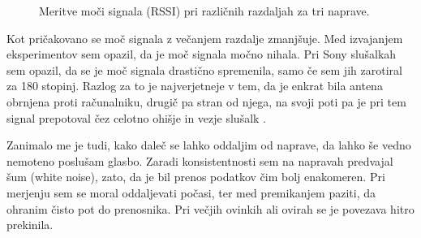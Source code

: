 \documentclass[11pt,a4paper,slovene]{article}
\begin{document}
\begin{figure}[H]
\centering
{}
\caption{Meritve moči signala (RSSI) pri različnih razdaljah za tri naprave.}
\label{fig:rssi-graf}
\end{figure}

Kot pričakovano se moč signala z večanjem razdalje zmanjšuje. Med izvajanjem eksperimentov sem opazil, da je moč signala močno nihala. Pri Sony slušalkah sem opazil, da se je moč signala drastično spremenila, samo če sem jih zarotiral za 180 stopinj. Razlog za to je najverjetneje v tem, da je enkrat bila antena obrnjena proti računalniku, drugič pa stran od njega, na svoji poti pa je pri tem signal prepotoval čez celotno ohišje in vezje slušalk \cite{sony_wh_xb910n}.

Zanimalo me je tudi, kako daleč se lahko oddaljim od naprave, da lahko še vedno nemoteno poslušam glasbo. Zaradi konsistentnosti sem na napravah predvajal šum (white noise), zato, da je bil prenos podatkov čim bolj enakomeren. Pri merjenju sem se moral oddaljevati počasi, ter med premikanjem paziti, da ohranim čisto pot do prenosnika. Pri večjih ovinkih ali ovirah se je povezava hitro prekinila.
\end{document}

